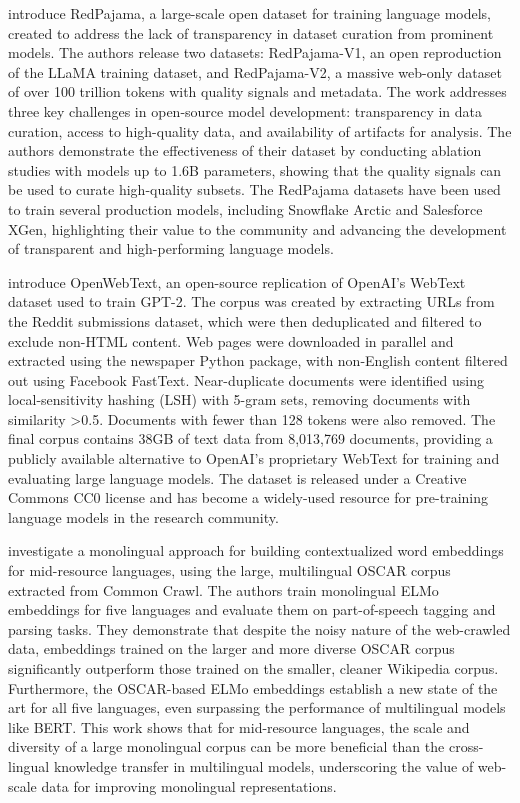 \documentclass[acmsmall]{acmart}
\begin{document}
  \citep{weber2024redpajamaopendatasettraining} introduce RedPajama, a large-scale open dataset for training language models, created to address the lack of transparency in dataset curation from prominent models. The authors release two datasets: RedPajama-V1, an open reproduction of the LLaMA training dataset, and RedPajama-V2, a massive web-only dataset of over 100 trillion tokens with quality signals and metadata. The work addresses three key challenges in open-source model development: transparency in data curation, access to high-quality data, and availability of artifacts for analysis. The authors demonstrate the effectiveness of their dataset by conducting ablation studies with models up to 1.6B parameters, showing that the quality signals can be used to curate high-quality subsets. The RedPajama datasets have been used to train several production models, including Snowflake Arctic and Salesforce XGen, highlighting their value to the community and advancing the development of transparent and high-performing language models.

  \citep{Gokaslan2019OpenWeb} introduce OpenWebText, an open-source replication of OpenAI's WebText dataset used to train GPT-2. The corpus was created by extracting URLs from the Reddit submissions dataset, which were then deduplicated and filtered to exclude non-HTML content. Web pages were downloaded in parallel and extracted using the newspaper Python package, with non-English content filtered out using Facebook FastText. Near-duplicate documents were identified using local-sensitivity hashing (LSH) with 5-gram sets, removing documents with similarity >0.5. Documents with fewer than 128 tokens were also removed. The final corpus contains 38GB of text data from 8,013,769 documents, providing a publicly available alternative to OpenAI's proprietary WebText for training and evaluating large language models. The dataset is released under a Creative Commons CC0 license and has become a widely-used resource for pre-training language models in the research community.

  \citep{ortiz-suarez-etal-2020-monolingual} investigate a monolingual approach for building contextualized word embeddings for mid-resource languages, using the large, multilingual OSCAR corpus extracted from Common Crawl. The authors train monolingual ELMo embeddings for five languages and evaluate them on part-of-speech tagging and parsing tasks. They demonstrate that despite the noisy nature of the web-crawled data, embeddings trained on the larger and more diverse OSCAR corpus significantly outperform those trained on the smaller, cleaner Wikipedia corpus. Furthermore, the OSCAR-based ELMo embeddings establish a new state of the art for all five languages, even surpassing the performance of multilingual models like BERT. This work shows that for mid-resource languages, the scale and diversity of a large monolingual corpus can be more beneficial than the cross-lingual knowledge transfer in multilingual models, underscoring the value of web-scale data for improving monolingual representations.
  
\end{document}
